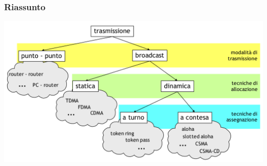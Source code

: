 \documentclass[12pt]{article}
\begin{document}
\clearpage
\subsubsection{Riassunto}\label{mac-allorazione-canale-a-contesa-riassunto}
\begin{center}
	\includegraphics[scale=0.4]{livello_collegamento-img15.png}
\end{center}



\clearpage
\end{document}
